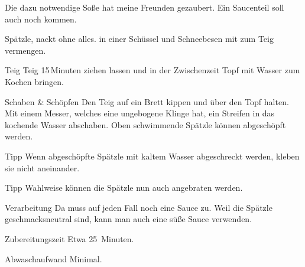 Die dazu notwendige Soße hat meine Freunden gezaubert. Ein Saucenteil soll auch noch kommen.
\begin{recipe}{Spätzle, nackt ohne alles.}
 in einer Schüssel und Schneebesen mit
 zum Teig vermengen.
\item[Teig] Teig 15\,Minuten ziehen lassen und in der Zwischenzeit Topf mit Wasser zum Kochen bringen. 
\item[Schaben \& Schöpfen] Den Teig auf ein Brett kippen und über den Topf halten. Mit einem Messer, welches eine ungebogene Klinge hat, ein Streifen in das kochende Wasser abschaben. Oben schwimmende Spätzle können abgeschöpft werden. 
\item[Tipp] Wenn abgeschöpfte Spätzle mit kaltem Wasser abgeschreckt werden, kleben sie nicht aneinander.
\item[Tipp] Wahlweise können die Spätzle nun auch angebraten werden.
\item[Verarbeitung] Da muss auf jeden Fall noch eine Sauce zu. Weil die Spätzle geschmacksneutral sind, kann man auch eine süße Sauce verwenden.
\item[Zubereitungszeit] Etwa 25~Minuten.
\item[Abwaschaufwand] Minimal.
\end{recipe}
